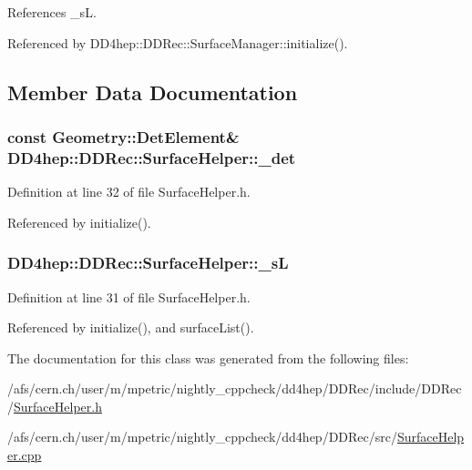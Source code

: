 References \_\-sL.

Referenced by DD4hep::DDRec::SurfaceManager::initialize().

\subsection{Member Data Documentation}
\hypertarget{class_d_d4hep_1_1_d_d_rec_1_1_surface_helper_a879149ec569894c3080e2e0f3464dd8d}{
\subsubsection[{\_\-det}]{\setlength{\rightskip}{0pt plus 5cm}const {\bf Geometry::DetElement}\& {\bf DD4hep::DDRec::SurfaceHelper::\_\-det}}}
\label{class_d_d4hep_1_1_d_d_rec_1_1_surface_helper_a879149ec569894c3080e2e0f3464dd8d}


Definition at line 32 of file SurfaceHelper.h.

Referenced by initialize().\hypertarget{class_d_d4hep_1_1_d_d_rec_1_1_surface_helper_a9284825af9dcbb9557f0cde59090dcd6}{
\subsubsection[{\_\-sL}]{ {\bf DD4hep::DDRec::SurfaceHelper::\_\-sL}}}
\label{class_d_d4hep_1_1_d_d_rec_1_1_surface_helper_a9284825af9dcbb9557f0cde59090dcd6}


Definition at line 31 of file SurfaceHelper.h.

Referenced by initialize(), and surfaceList().

The documentation for this class was generated from the following files:\begin{DoxyCompactItemize}
\item 
/afs/cern.ch/user/m/mpetric/nightly\_\-cppcheck/dd4hep/DDRec/include/DDRec/\hyperlink{_surface_helper_8h}{SurfaceHelper.h}\item 
/afs/cern.ch/user/m/mpetric/nightly\_\-cppcheck/dd4hep/DDRec/src/\hyperlink{_surface_helper_8cpp}{SurfaceHelper.cpp}\end{DoxyCompactItemize}
